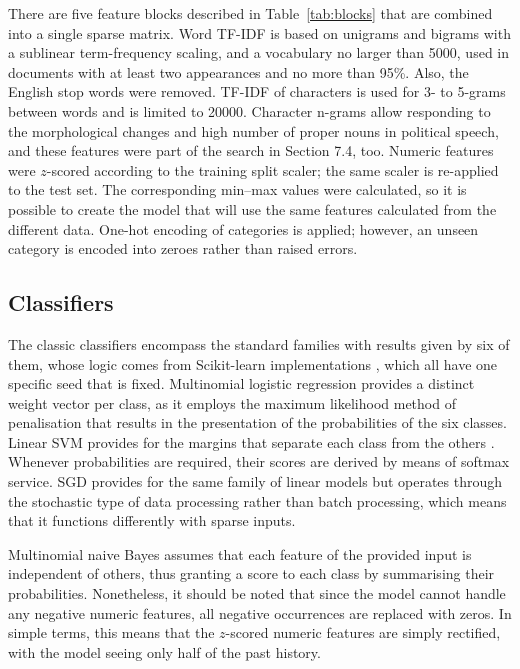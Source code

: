 There are five feature blocks described in Table~\ref{tab:blocks} that are combined into a single sparse matrix. Word TF-IDF is based on unigrams and bigrams with a sublinear term-frequency scaling, and a vocabulary no larger than 5000, used in documents with at least two appearances and no more than 95\%. Also, the English stop words were removed. TF-IDF of characters is used for 3- to 5-grams between words and is limited to 20000. Character n-grams allow responding to the morphological changes and high number of proper nouns in political speech, and these features were part of the search in Section 7.4, too. Numeric features were $z$-scored according to the training split scaler; the same scaler is re-applied to the test set. The corresponding min--max values were calculated, so it is possible to create the model that will use the same features calculated from the different data. One-hot encoding of categories is applied; however, an unseen category is encoded into zeroes rather than raised errors.



\subsection{Classifiers}

The classic classifiers encompass the standard families with results given by six of them, whose logic comes from Scikit-learn implementations \cite{pedregosa2011scikit}, which all have one specific seed that is fixed. Multinomial logistic regression provides a distinct weight vector per class, as it employs the maximum likelihood method of penalisation that results in the presentation of the probabilities of the six classes. Linear SVM provides for the margins that separate each class from the others \cite{cortes1995support}. Whenever probabilities are required, their scores are derived by means of softmax service. SGD provides for the same family of linear models but operates through the stochastic type of data processing rather than batch processing, which means that it functions differently with sparse inputs.

Multinomial naive Bayes \cite{mccallum1998comparison} assumes that each feature of the provided input is independent of others, thus granting a score to each class by summarising their probabilities. Nonetheless, it should be noted that since the model cannot handle any negative numeric features, all negative occurrences are replaced with zeros. In simple terms, this means that the $z$-scored numeric features are simply rectified, with the model seeing only half of the past history.

